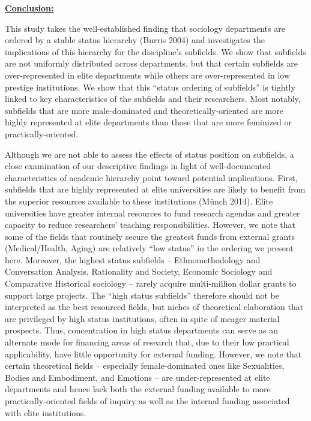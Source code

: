 \documentclass{article}
\begin{document}
\textbf{\uline{Conclusion:}}

This study takes the well-established finding that sociology departments
are ordered by a stable status hierarchy (Burris 2004) and investigates
the implications of this hierarchy for the discipline's subfields. We
show that subfields are not uniformly distributed across departments,
but that certain subfields are over-represented in elite departments
while others are over-represented in low prestige institutions. We show
that this ``status ordering of subfields'' is tightly linked to key
characteristics of the subfields and their researchers. Most notably,
subfields that are more male-dominated and theoretically-oriented are
more highly represented at elite departments than those that are more
feminized or practically-oriented.

Although we are not able to assess the effects of status position on
subfields, a close examination of our descriptive findings in light of
well-documented characteristics of academic hierarchy point toward
potential implications. First, subfields that are highly represented at
elite universities are likely to benefit from the superior resources
available to these institutions (Münch 2014). Elite universities have
greater internal resources to fund research agendas and greater capacity
to reduce researchers' teaching responsibilities. However, we note that
some of the fields that routinely secure the greatest funds from
external grants (Medical/Health, Aging) are relatively ``low status'' in
the ordering we present here. Moreover, the highest status subfields --
Ethnomethodology and Conversation Analysis, Rationality and Society,
Economic Sociology and Comparative Historical sociology -- rarely
acquire multi-million dollar grants to support large projects. The
``high status subfields'' therefore should not be interpreted as the
best resourced fields, but niches of theoretical elaboration that are
privileged by high status institutions, often in spite of meager
material prospects. Thus, concentration in high status departments can
serve as an alternate mode for financing areas of research that, due to
their low practical applicability, have little opportunity for external
funding. However, we note that certain theoretical fields -- especially
female-dominated ones like Sexualities, Bodies and Embodiment, and
Emotions -- are under-represented at elite departments and hence lack
both the external funding available to more practically-oriented fields
of inquiry as well as the internal funding associated with elite
institutions.
\end{document}
